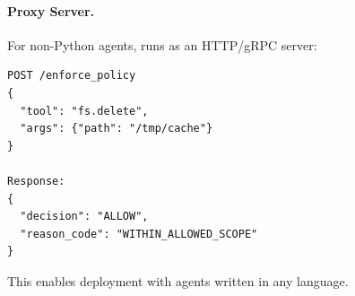 \paragraph{Proxy Server.}
For non-Python agents, \sys{} runs as an HTTP/gRPC server:
\begin{verbatim}
POST /enforce_policy
{
  "tool": "fs.delete",
  "args": {"path": "/tmp/cache"}
}

Response:
{
  "decision": "ALLOW",
  "reason_code": "WITHIN_ALLOWED_SCOPE"
}
\end{verbatim}

This enables deployment with agents written in any language.